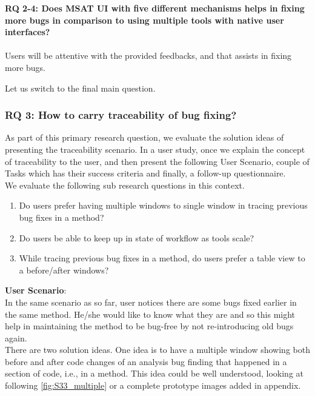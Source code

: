 \begin{myboxi}{{\textbf{RQ 2-4: Does MSAT UI with five different mechanisms helps in fixing more bugs in comparison to using multiple tools with native user interfaces?}}}
	\\ \\ Users will be attentive with the provided feedbacks, and that assists in fixing more bugs. \\
\end{myboxi}


Let us switch to the final main question. \\

\subsubsection{RQ 3: How to carry traceability of bug fixing?}

As part of this primary research question, we evaluate the solution ideas of presenting the traceability scenario. In a user study, once we explain the concept of traceability to the user, and then present the following User Scenario, couple of Tasks which has their success criteria and finally, a follow-up questionnaire. \\

We evaluate the following sub research questions in this context. \\

\begin{enumerate}
\item Do users prefer having multiple windows to single window in tracing previous bug fixes in a method?
\item Do users be able to keep up in state of workflow as tools scale?
\item While tracing previous bug fixes in a method, do users prefer a table view to a before/after windows?
\end{enumerate}


\textbf{User Scenario}: \\

In the same scenario as so far, user notices there are some bugs fixed earlier in the same method. He/she would like to know what they are and so this might help in maintaining the method to be bug-free by not re-introducing old bugs again. \\

There are two solution ideas. One idea is to have a multiple window showing both before and after code changes of an analysis bug finding that happened in a section of code, i.e., in a method. This idea could be well understood, looking at following \autoref{fig:S33_multiple} or a complete prototype images added in appendix. \\


